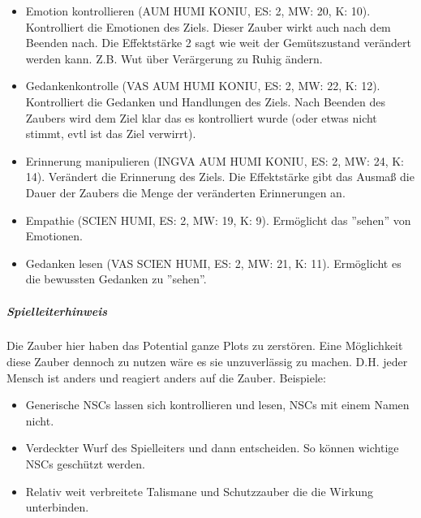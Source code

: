 \documentclass{article}
\begin{document}
\begin{itemize}
\item Emotion kontrollieren (AUM HUMI KONIU, ES: 2, MW: 20, K: 10). Kontrolliert die Emotionen des Ziels. Dieser Zauber wirkt auch nach dem Beenden nach. Die Effektstärke 2 sagt wie weit der Gemütszustand verändert werden kann. Z.B. Wut über Verärgerung zu Ruhig ändern.
\end{itemize}

\begin{itemize}
\item Gedankenkontrolle (VAS AUM HUMI KONIU, ES: 2, MW: 22, K: 12). Kontrolliert die Gedanken und Handlungen des Ziels. Nach Beenden des Zaubers wird dem Ziel klar das es kontrolliert wurde (oder etwas nicht stimmt, evtl ist das Ziel verwirrt).
\end{itemize}

\begin{itemize}
\item Erinnerung manipulieren (INGVA AUM HUMI KONIU, ES: 2, MW: 24, K: 14). Verändert die Erinnerung des Ziels. Die Effektstärke gibt das Ausmaß die Dauer der Zaubers die Menge der veränderten Erinnerungen an.
\end{itemize}

\begin{itemize}
\item Empathie (SCIEN HUMI, ES: 2, MW: 19, K: 9). Ermöglicht das ''sehen'' von Emotionen.
\end{itemize}

\begin{itemize}
\item Gedanken lesen (VAS SCIEN HUMI, ES: 2, MW: 21, K: 11). Ermöglicht es die bewussten Gedanken zu ''sehen''.
\end{itemize}

\begin{mdframed}[hidealllines=true, backgroundcolor=black!10]
\subparagraph{Spielleiterhinweis}

Die Zauber hier haben das Potential ganze Plots zu zerstören. Eine Möglichkeit diese Zauber dennoch zu nutzen wäre
es sie unzuverlässig zu machen. D.H. jeder Mensch ist anders und reagiert anders auf die Zauber. Beispiele:

\begin{itemize}
\item Generische NSCs lassen sich kontrollieren und lesen, NSCs mit einem Namen nicht.
\item Verdeckter Wurf des Spielleiters und dann entscheiden. So können wichtige NSCs geschützt werden.
\item Relativ weit verbreitete Talismane und Schutzzauber die die Wirkung unterbinden.
\end{itemize}

\end{mdframed}
\end{document}
